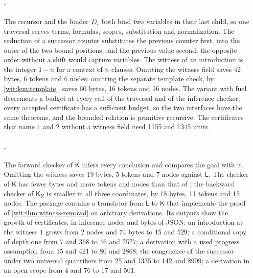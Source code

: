 \paragraph{.}
The recursor and the binder $D_{,}$ both bind two variables in their last
child, so one traversal serves terms, formulas, scopes, substitution and
normalization.  The reduction of a successor counter substitutes the
previous counter first, into the outer of the two bound positions, and the
previous value second; the opposite order without a shift would capture
variables.  The witness of an introduction is the integer $1-n$ for a
context of $n$ clauses.  Omitting the witness field saves 42 bytes, 6
tokens and 6 nodes; omitting the separate template check, by
\cref{wit:lem:template}, saves 60 bytes, 16 tokens and 16 nodes.  The
variant with fuel decrements a budget at every call of the traversal and of
the inference checker; every accepted certificate has a sufficient budget,
so the two interfaces have the same theorems, and the bounded relation is
primitive recursive.  The certificates that name $1$ and $2$ without a
witness field need 1155 and 1345 units.

\paragraph{.}
The forward checker of $\mathsf{K}$ infers every conclusion and compares
the goal with it.  Omitting the witness saves 19 bytes, 5 tokens and 7
nodes against $\mathsf{L}$.  The checker of $\mathsf{K}$ has fewer bytes
and more tokens and nodes than that of ; the backward
checker of $\mathsf{K}_{\mathrm N}$ is smaller in all three coordinates, by
18 bytes, 11 tokens and 15 nodes.  The package contains a translator from
$\mathsf{L}$ to $\mathsf{K}$ that implements the proof of
\cref{wit:thm:witness-removal} on arbitrary derivations.  Its outputs show
the growth of certificates, in inference nodes and bytes of JSON: an
introduction at the witness $1$ grows from 2 nodes and 74 bytes to 15 and
529; a conditional copy of depth one from 7 and 368 to 46 and 2527; a
derivation with a used progress assumption from 15 and 421 to 80 and 2868;
the congruence of the successor under two universal quantifiers from 25 and
1335 to 142 and 8909; a derivation in an open scope from 4 and 76 to 17 and
501.


